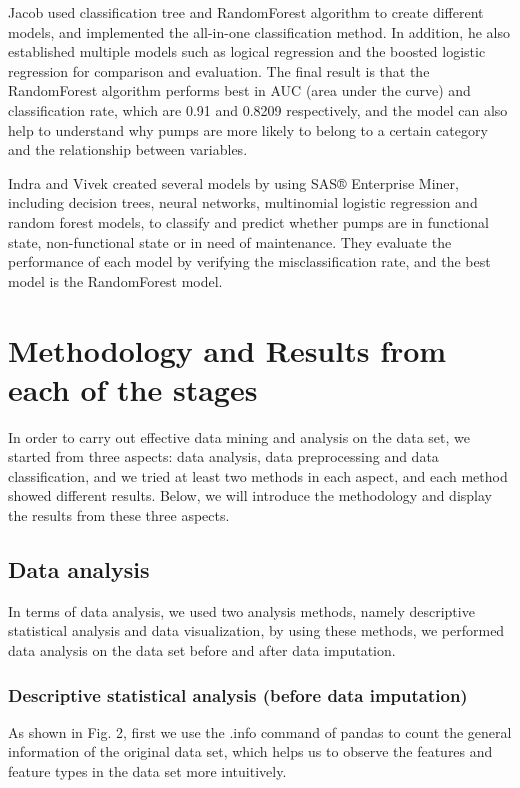 \documentclass[conference]{IEEEtran}
\begin{document}
Jacob \cite{b3} used classification tree and RandomForest algorithm to create different models, and implemented the all-in-one classification method. In addition, he also established multiple models such as logical regression and the boosted logistic regression for comparison and evaluation. The final result is that the RandomForest algorithm performs best in AUC (area under the curve) and classification rate, which are 0.91 and 0.8209 respectively, and the model can also help to understand why pumps are more likely to belong to a certain category and the relationship between variables.

Indra and Vivek \cite{b4} created several models by using SAS® Enterprise Miner, including decision trees, neural networks, multinomial logistic regression and random forest models, to classify and predict whether pumps are in functional state, non-functional state or in need of maintenance. They evaluate the performance of each model by verifying the misclassification rate, and the best model is the RandomForest model.

\section{Methodology and Results from each of the stages}

In order to carry out effective data mining and analysis on the data set, we started from three aspects: data analysis, data preprocessing and data classification, and we tried at least two methods in each aspect, and each method showed different results. Below, we will introduce the methodology and display the results from these three aspects.

\subsection{Data analysis}

In terms of data analysis, we used two analysis methods, namely descriptive statistical analysis and data visualization, by using these methods, we performed data analysis on the data set before and after data imputation.

\subsubsection{Descriptive statistical analysis (before data imputation)}

As shown in Fig. 2, first we use the .info command of pandas to count the general information of the original data set, which helps us to observe the features and feature types in the data set more intuitively.
\end{document}
